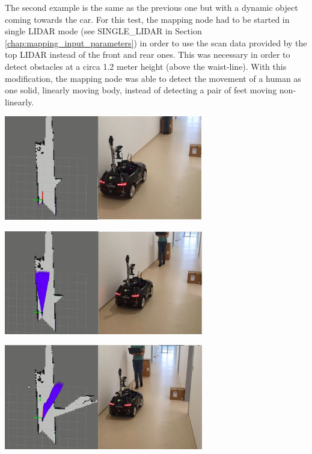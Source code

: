The second example is the same as the previous one but with a dynamic object coming towards the car. For this test, the mapping node had to be started in single LIDAR mode (see SINGLE\_LIDAR in Section \ref{chap:mapping_input_parameters}) in order to use the scan data provided by the top LIDAR instead of the front and rear ones. This was necessary in order to detect obstacles at a circa 1.2 meter height (above the waist-line). With this modification, the mapping node was able to detect the movement of a human as one solid, linearly moving body, instead of detecting a pair of feet moving non-linearly. 

\begin{center}
    \includegraphics[width=0.65\textwidth]{figures/raw/jpeg/local_planner_real_test_joined_straight_traj_1_dynamic_obj_1.jpg}
    
    \vspace{0.5cm}
    \includegraphics[width=0.65\textwidth]{figures/raw/jpeg/local_planner_real_test_joined_straight_traj_1_dynamic_obj_2.jpg}
    
    \vspace{0.5cm}
    \includegraphics[width=0.65\textwidth]{figures/raw/jpeg/local_planner_real_test_joined_straight_traj_1_dynamic_obj_3.jpg}
    

\end{center}
